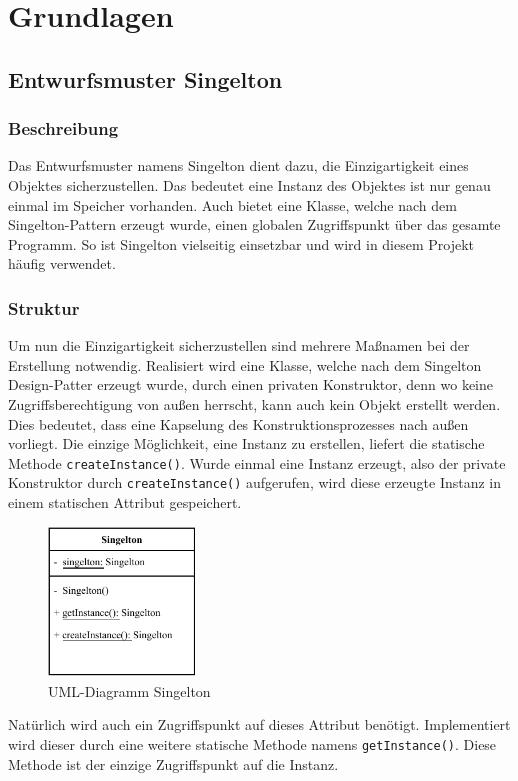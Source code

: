 \section{Grundlagen}\label{sec:grundlagen}
\subsection{Entwurfsmuster Singelton}\label{subsec:entwurdsmuster-singelton}
\subsubsection{Beschreibung}
Das Entwurfsmuster namens Singelton dient dazu, die Einzigartigkeit eines Objektes sicherzustellen.
Das bedeutet eine Instanz des Objektes ist nur genau einmal im Speicher vorhanden.
Auch bietet eine Klasse, welche nach dem Singelton-Pattern erzeugt wurde, einen globalen Zugriffspunkt über das gesamte Programm.
So ist Singelton vielseitig einsetzbar und wird in diesem Projekt häufig verwendet.
\subsubsection{Struktur}
Um nun die Einzigartigkeit sicherzustellen sind mehrere Maßnamen bei der Erstellung notwendig.
Realisiert wird eine Klasse, welche nach dem Singelton Design-Patter erzeugt wurde, durch einen privaten Konstruktor, denn wo keine Zugriffsberechtigung von außen herrscht, kann auch kein Objekt erstellt werden.
Dies bedeutet, dass eine Kapselung des Konstruktionsprozesses nach außen vorliegt.
Die einzige Möglichkeit, eine Instanz zu erstellen, liefert die statische Methode \lstinline{createInstance()}.
Wurde einmal eine Instanz erzeugt, also der private Konstruktor durch \lstinline{createInstance()} aufgerufen, wird diese erzeugte Instanz in einem statischen Attribut gespeichert.\\
\begin{figure}[H]
    \centering
    \includegraphics[width=0.35\textwidth]{fig/ainf/Singelton.pdf}
    \caption{\acs{UML}-Diagramm Singelton}
\end{figure}
Natürlich wird auch ein Zugriffspunkt auf dieses Attribut benötigt.
Implementiert wird dieser durch eine weitere statische Methode namens \lstinline{getInstance()}.
Diese Methode ist der einzige Zugriffspunkt auf die Instanz.
